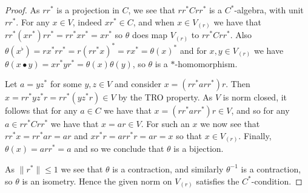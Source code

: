 \documentclass[10pt,a4paper]{amsart}
\begin{document}
\begin{proof}
As $rr^*$ is a projection in $C$, we see that $rr^* C rr^*$ is a $C^*$-algebra, with unit $rr^*$.  For any $x\in V$, indeed $xr^* \in C$, and when $x\in V_{(r)}$ we have that $rr^*(xr^*)rr^* = rr^* x r^* = xr^*$ so $\theta$ does map $V_{(r)}$ to $rr^* C rr^*$.  Also $\theta(x^\flat) = rx^*rr^* = r(rr^*x)^* = rx^* = \theta(x)^*$ and for $x,y\in V_{(r)}$ we have $\theta(x\bullet y) = xr^*yr^* = \theta(x)\theta(y)$, so $\theta$ is a $*$-homomorphism.

Let $a = yz^*$ for some $y,z\in V$ and consider $x = (rr^* a rr^*) r$.  Then $x = rr^* yz^* r = rr^* (yz^* r) \in V$ by the TRO property.  As $V$ is norm closed, it follows that for any $a\in C$ we have that $x = (rr^* a rr^*) r \in V$, and so for any $a\in rr^* C rr^*$ we have that $x = ar \in V$.  For such an $x$ we now see that $rr^* x = rr^* a r = ar$ and $x r^*r = arr^*r = ar = x$ so that $x\in V_{(r)}$.  Finally, $\theta(x) = arr^* = a$ and so we conclude that $\theta$ is a bijection.

As $\|r^*\|\leq 1$ we see that $\theta$ is a contraction, and similarly $\theta^{-1}$ is a contraction, so $\theta$ is an isometry.  Hence the given norm on $V_{(r)}$ satisfies the $C^*$-condition.
\end{proof}
\end{document}
